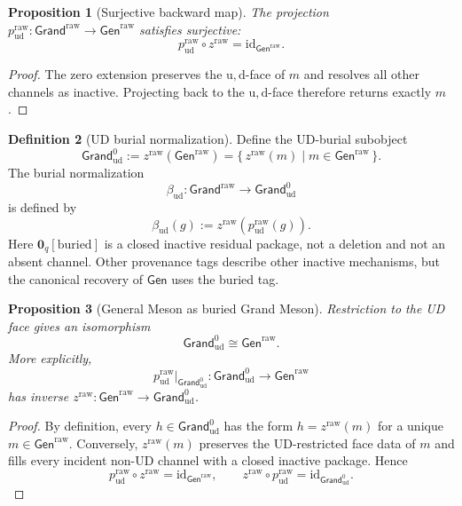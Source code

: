 \documentclass[11pt]{article}
\theoremstyle{definition}
\newtheorem{definition}{Definition}
\theoremstyle{plain}
\newtheorem{proposition}[definition]{Proposition}
\newcommand{\qu}{\mathrm u}
\newcommand{\qd}{\mathrm d}
\begin{document}
\begin{proposition}[Surjective backward map]
The projection
\(p^{\mathrm{raw}}_{\qu\qd}:\mathsf{Grand}^{\mathrm{raw}}\to
\mathsf{Gen}^{\mathrm{raw}}\) satisfies
surjective:
\[
  p^{\mathrm{raw}}_{\qu\qd}\circ z^{\mathrm{raw}}
  =\mathrm{id}_{\mathsf{Gen}^{\mathrm{raw}}}.
\]
\end{proposition}

\begin{proof}
The zero extension preserves the \(\qu,\qd\)-face of \(m\) and resolves
all other channels as inactive.  Projecting back to the
\(\qu,\qd\)-face therefore returns exactly \(m\).
\end{proof}

\begin{definition}[UD burial normalization]
Define the UD-burial subobject
\[
  \mathsf{Grand}_{\qu\qd}^{0}
  :=
  z^{\mathrm{raw}}(\mathsf{Gen}^{\mathrm{raw}})
  =
  \{\,z^{\mathrm{raw}}(m)\mid m\in\mathsf{Gen}^{\mathrm{raw}}\,\}.
\]
The burial normalization
\[
  \beta_{\qu\qd}:\mathsf{Grand}^{\mathrm{raw}}\longrightarrow
  \mathsf{Grand}_{\qu\qd}^{0}
\]
is defined by
\[
  \beta_{\qu\qd}(g):=
  z^{\mathrm{raw}}(p^{\mathrm{raw}}_{\qu\qd}(g)).
\]
Here \(\mathbf 0_q[\mathrm{buried}]\) is a closed inactive residual package,
not a deletion and not an absent channel.  Other provenance tags describe
other inactive mechanisms, but the canonical recovery of \(\mathsf{Gen}\)
uses the buried tag.
\end{definition}

\begin{proposition}[General Meson as buried Grand Meson]
Restriction to the UD face gives an isomorphism
\[
  \mathsf{Grand}_{\qu\qd}^{0}\cong\mathsf{Gen}^{\mathrm{raw}}.
\]
More explicitly,
\[
  p^{\mathrm{raw}}_{\qu\qd}|_{\mathsf{Grand}_{\qu\qd}^{0}}
  :\mathsf{Grand}_{\qu\qd}^{0}\to\mathsf{Gen}^{\mathrm{raw}}
\]
has inverse
\(z^{\mathrm{raw}}:\mathsf{Gen}^{\mathrm{raw}}\to
\mathsf{Grand}_{\qu\qd}^{0}\).
\end{proposition}

\begin{proof}
By definition, every \(h\in\mathsf{Grand}_{\qu\qd}^{0}\) has the form
\(h=z^{\mathrm{raw}}(m)\) for a unique
\(m\in\mathsf{Gen}^{\mathrm{raw}}\).  Conversely, \(z^{\mathrm{raw}}(m)\)
preserves the UD-restricted face data of \(m\) and fills every incident
non-UD channel with a closed inactive package.  Hence
\[
  p^{\mathrm{raw}}_{\qu\qd}\circ z^{\mathrm{raw}}
  =\mathrm{id}_{\mathsf{Gen}^{\mathrm{raw}}},
  \qquad
  z^{\mathrm{raw}}\circ p^{\mathrm{raw}}_{\qu\qd}
  =
  \mathrm{id}_{\mathsf{Grand}_{\qu\qd}^{0}}.
\]
\end{proof}
\end{document}
